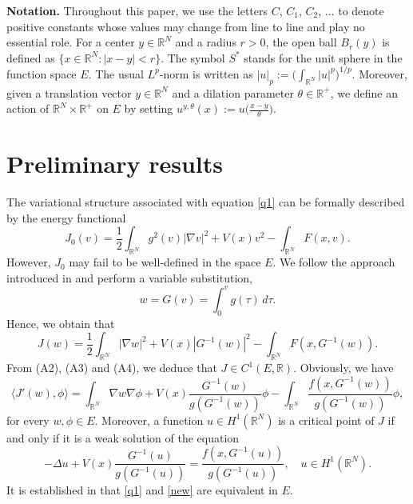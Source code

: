 \documentclass[10pt,a4paper]{amsart}
\numberwithin{equation}{section}
\begin{document}
\noindent\textbf{Notation.} 
Throughout this paper, we use the letters \(C\), \(C_1\), \(C_2\), $\ldots$ to denote positive constants whose values may change from line to line and play no essential role. 
For a center \(y \in \mathbb{R}^N\) and a radius \(r > 0\), the open ball \(B_r(y)\) is defined as 
\(\{x \in \mathbb{R}^N : |x - y| < r\}\). The symbol \(S^*\) stands for the unit sphere in the function 
space \(E\). The usual \(L^p\)-norm is written as 
\(|u|_p := \bigl(\int_{\mathbb{R}^N} |u|^p\bigr)^{1/p}\). Moreover, given a translation vector 
\(y \in \mathbb{R}^N\) and a dilation parameter \(\theta \in \mathbb{R}^+\), we define an action of 
\(\mathbb{R}^N \times \mathbb{R}^+\) on \(E\) by setting 
\(u^{y,\theta}(x) := u\bigl(\frac{x-y}{\theta}\bigr)\).

\section{Preliminary results} \label{s2}

The variational structure associated with equation \eqref{q1} can be formally described by 
the energy functional
$$
J_0(v)=\frac{1}{2}\int_{\mathbb{R}^N}g^2(v)|\nabla v|^2+V(x)v^2-\int_{\mathbb{R}^N}F(x,v).
$$
However, $J_0$ may fail to be well‑defined   in the space $E$. We follow the approach introduced 
in \cite{shen} and perform a variable substitution,
$$
w=G(v)=\int^v_0g(\tau)\,d\tau.
$$
Hence, we obtain that
\begin{equation}
\label{q2}
J(w)=\frac{1}{2}\int_{\mathbb{R}^{N}}|\nabla w|^{2}+V(x)|G^{-1}(w)|^2-\int_{\mathbb{R}^{N}}F(x,G^{-1}(w)).
\end{equation}
From (A2), (A3) and (A4), we deduce that $J\in C^1(E,\mathbb{R})$. Obviously, we have
\begin{equation}
\label{q3}
\langle J'(w),\phi\rangle =\int_{\mathbb{R}^{N}}\nabla w \nabla \phi+V(x)
\frac{G^{-1}(w)}{g(G^{-1}(w))}\phi-\int_{\mathbb{R}^{N}}\frac{f(x,G^{-1}(w))}{g(G^{-1}(w))}\phi,
\end{equation}
for every $w, \phi\in E$. Moreover, a function \( u \in H^1(\mathbb{R}^{N}) \) is a critical point 
of \(J\) if and only if it is a weak solution of the equation
\begin{equation}\label{new}
-\Delta u+V(x)\frac{G^{-1}(u)}{g(G^{-1}(u))}=\frac{f(x,G^{-1}(u))}{g(G^{-1}(u))}, \quad u\in H^1(\mathbb{R}^{N}).
\end{equation}
It is established in \cite{shen} that \eqref{q1} and \eqref{new} are equivalent in $E$.
\end{document}
